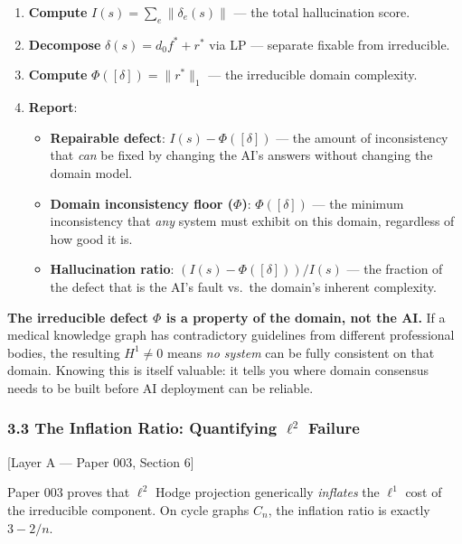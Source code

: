 \documentclass[
]{article}
\providecommand{\tightlist}{%
  \setlength{\itemsep}{0pt}\setlength{\parskip}{0pt}}
\begin{document}
\begin{enumerate}
\def\labelenumi{\arabic{enumi}.}
\tightlist
\item
  \textbf{Compute} \(I(s) = \sum_e \|\delta_e(s)\|\) --- the total
  hallucination score.
\item
  \textbf{Decompose} \(\delta(s) = d_0 f^* + r^*\) via LP --- separate
  fixable from irreducible.
\item
  \textbf{Compute} \(\Phi([\delta]) = \|r^*\|_1\) --- the irreducible
  domain complexity.
\item
  \textbf{Report}:

  \begin{itemize}
  \tightlist
  \item
    \textbf{Repairable defect}: \(I(s) - \Phi([\delta])\) --- the amount
    of inconsistency that \emph{can} be fixed by changing the AI's
    answers without changing the domain model.
  \item
    \textbf{Domain inconsistency floor (\(\Phi\))}: \(\Phi([\delta])\)
    --- the minimum inconsistency that \emph{any} system must exhibit on
    this domain, regardless of how good it is.
  \item
    \textbf{Hallucination ratio}: \((I(s) - \Phi([\delta])) / I(s)\) ---
    the fraction of the defect that is the AI's fault vs.~the domain's
    inherent complexity.
  \end{itemize}
\end{enumerate}

\textbf{The irreducible defect \(\Phi\) is a property of the domain, not
the AI.} If a medical knowledge graph has contradictory guidelines from
different professional bodies, the resulting \(H^1 \neq 0\) means
\emph{no system} can be fully consistent on that domain. Knowing this is
itself valuable: it tells you where domain consensus needs to be built
before AI deployment can be reliable.

\subsubsection{\texorpdfstring{3.3 The Inflation Ratio: Quantifying
\(\ell^2\)
Failure}{3.3 The Inflation Ratio: Quantifying \textbackslash ell\^{}2 Failure}}\label{the-inflation-ratio-quantifying-ell2-failure}

{[}Layer A --- Paper 003, Section 6{]}

Paper 003 proves that \(\ell^2\) Hodge projection generically
\emph{inflates} the \(\ell^1\) cost of the irreducible component. On
cycle graphs \(C_n\), the inflation ratio is exactly \(3 - 2/n\).
\end{document}

